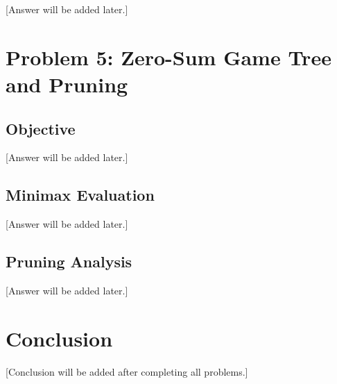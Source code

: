 \documentclass[12pt]{article}
\begin{document}
[Answer will be added later.]

\section{Problem 5: Zero-Sum Game Tree and Pruning}

\subsection{Objective}

[Answer will be added later.]

\subsection{Minimax Evaluation}

[Answer will be added later.]

\subsection{Pruning Analysis}

[Answer will be added later.]

\section{Conclusion}

[Conclusion will be added after completing all problems.]
\end{document}
